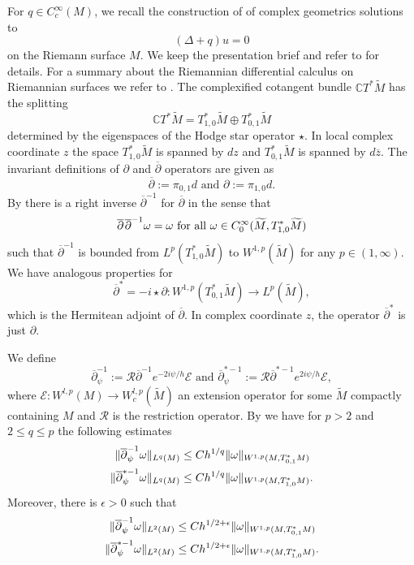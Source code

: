 \documentclass[12pt]{amsart}
\def\p{\partial}
\def\C{\mathbb C}
\DeclarePairedDelimiter\norm{\lVert}{\rVert}
\theoremstyle{definition}
\theoremstyle{remark}
\newcommand{\eps}{\epsilon}
\newcommand{\s}{\hspace{0.5pt}}
\newcommand{\ol}{\overline}
\newcommand{\op}{\overline \p}
\begin{document}
For $q\in C^\infty_c(M)$, we recall the construction of \cite{guillarmou2011identification} of complex geometrics solutions to
\[
 (\Delta +q)u=0
\]
 on the Riemann surface $ M$. We keep the presentation brief and refer to \cite[Section 2]{guillarmou2011identification} for details. For a summary about the Riemannian differential calculus on Riemannian surfaces we refer to \cite{guillarmou2011calderon}. The complexified cotangent bundle $\C T^*\widetilde M$ has the splitting
\[
 \C T^*\widetilde M= T^*_{1,0}\widetilde M \oplus T^*_{0,1}\widetilde M
\]
determined by the eigenspaces of the Hodge star operator $\star$. 
In local  complex coordinate $z$ the space $T^*_{1,0}\widetilde M$ is spanned by $dz$ and $T^*_{0,1}\widetilde M$ is spanned by $d\ol z$.  The invariant definitions of $\p$ and $\op$ operators are given as
\[
 \op:=\pi_{0,1}d \text{ and } \p:=\pi_{1,0}d.
\]
By \cite[Proposition 2.1]{guillarmou2011identification} there is a right inverse $\op^{-1}$ for $\op$ in the sense that
\[
 \op\s \s  \op^{-1}\omega=\omega \text{ for all } \omega\in C_0^\infty(\widetilde M,T_{1,0}^*\widetilde M)
\]
such that $\op^{-1}$ is bounded from $L^p(T_{1,0}^*\widetilde M)$ to $W^{1,p}(\widetilde M)$ for any $p\in (1,\infty)$. We have analogous properties for 
\[
 \op^*=-i\star \p: W^{1,p}(T_{0,1}^*\widetilde M)\to L^p(\widetilde M),
\]
which is the Hermitean adjoint of $\op$. In complex coordinate $z$, the operator $\op^*$ is just $\p$.

We define 
\[
 \op_\psi^{-1}:=\mathcal{R}\op^{-1}e^{-2i\psi/h}\mathcal{E} \text{ and } \op_\psi^{*-1}:=\mathcal{R}\op^{*-1}e^{2i\psi/h}\mathcal{E},
\]
{\color{black} where $\mathcal{E} : W^{l,p}(M) \to W_c^{l,p}(\widetilde M)$ an extension operator for some $\widetilde M$ compactly containing $M$ and $\mathcal R$ is the restriction operator}.
By \cite[Lemma 2.2 and Lemma 2.3]{guillarmou2011identification} we have for $p>2$ and $2\leq q\leq p$ the following estimates 
\begin{align}\label{eq:sobo_decay}
\begin{split}
 \norm{\overline \p_\psi^{-1}\omega}_{L^q(M)}&\leq C h^{1/q}\norm{\omega}_{W^{1,p}(M, T_{0,1}^*M)} \\
 \norm{\overline \p_\psi^{*-1}\omega}_{L^q(M)}&\leq C h^{1/q}\norm{\omega}_{W^{1,p}(M, T_{1,0}^*M)}.
 \end{split}
\end{align}
Moreover, there is $\eps>0$ such that 
\begin{align}\label{eq:sobo_decayL2}
\begin{split}
 \norm{\overline \p_\psi^{-1}\omega}_{L^2(M)}&\leq C h^{1/2+\eps}\norm{\omega}_{W^{1,p}(M, T_{0,1}^*M)} \\
 \norm{\overline \p_\psi^{*-1}\omega}_{L^2(M)}&\leq C h^{1/2+\eps}\norm{\omega}_{W^{1,p}(M, T_{1,0}^*M)}.
 \end{split}
\end{align}
\end{document}

